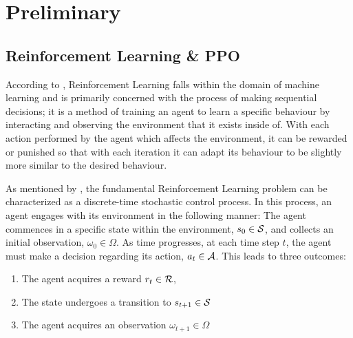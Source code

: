 \chapter{Preliminary}


\section{Reinforcement Learning \& PPO}

According to \cite{Fran_ois_Lavet_2018_rlintro}, Reinforcement Learning falls within the domain of machine learning and is primarily concerned with the process of making sequential decisions; it is a method of training an agent to learn a specific behaviour by interacting and observing the environment that it exists inside of. With each action performed by the agent which affects the environment, it can be rewarded or punished so that with each iteration it can adapt its behaviour to be slightly more similar to the desired behaviour. 


As mentioned by \cite{Fran_ois_Lavet_2018_rlintro}, the fundamental Reinforcement Learning problem can be characterized as a discrete-time stochastic control process. In this process, an agent engages with its environment in the following manner: The agent commences in a specific state within the environment, $s_0 \in {\mathcal{S}}$, and collects an initial observation, $\omega_0 \in \Omega$. As time progresses, at each time step $t$, the agent must make a decision regarding its action, $a_t \in {\mathcal{A}}$. This leads to three outcomes:
\begin{enumerate}
    \item The agent acquires a reward $r_t \in {\mathcal{R}}$,
    \item The state undergoes a transition to $s_{t+1} \in {\mathcal{S}}$
    \item The agent acquires an observation $\omega_{t+1} \in \Omega$
\end{enumerate}

